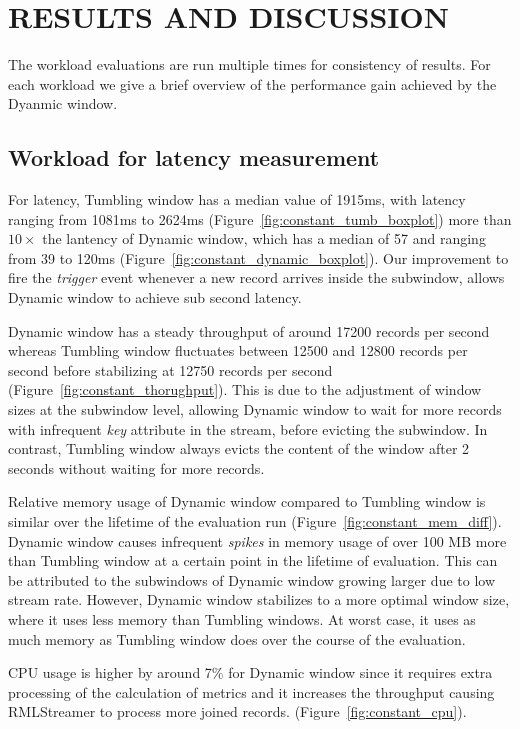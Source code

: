 \section{RESULTS AND DISCUSSION}%
\label{chap:Results and Discussion}

The workload evaluations are run multiple times for consistency of results. 
For each workload we give a brief overview of the performance gain 
achieved by the Dyanmic window. 

\subsection{Workload for latency measurement}%
\label{sec:Results Workload for latency measurement}
For latency, Tumbling window has a median value of 1915ms, 
with latency ranging from 1081ms to 2624ms (Figure~\ref{fig:constant_tumb_boxplot})
more than $10\times$ the lantency of Dynamic window, which has a median 
of 57 and ranging from 39 to 120ms (Figure~\ref{fig:constant_dynamic_boxplot}). 
Our improvement to fire the \emph{trigger} event whenever a
new record arrives inside the 
subwindow, allows 
Dynamic window to achieve sub second latency. 

Dynamic window has a 
steady throughput of around 17200 records per second whereas Tumbling window fluctuates between 
12500 and 12800 records per second before stabilizing at 12750 records per second (Figure~\ref{fig:constant_thorughput}). 
This is due to the adjustment of window sizes at the subwindow level, allowing Dynamic window to wait for more records 
with infrequent \emph{key} attribute in the stream, before evicting the subwindow. 
In contrast, Tumbling window 
always evicts the content of the window after 2 seconds without waiting for more 
records.

Relative memory usage of Dynamic window compared to Tumbling window 
is similar over the lifetime of the 
evaluation run (Figure~\ref{fig:constant_mem_diff}). 
Dynamic window causes infrequent \emph{spikes} in memory usage of over
100 MB more than Tumbling window at a certain point in the lifetime of evaluation. 
This can be attributed 
to the subwindows of Dynamic window growing larger due to low stream 
rate. However,
Dynamic window stabilizes to a more optimal 
window size, where it uses less memory than Tumbling windows. 
At worst case, it uses as much memory as Tumbling window does over the course of the evaluation. 

CPU usage is higher by around 7\% for Dynamic window since it requires extra processing of the calculation of metrics and 
it increases the throughput causing RMLStreamer to process more joined records.
(Figure~\ref{fig:constant_cpu}). 

